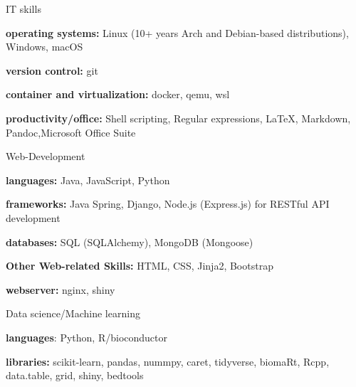 

\begin{cvskills}
  \cvskill
    {IT skills} %
    {
      \begin{cvitems}
        \item {\textbf{operating systems:} Linux (10+ years Arch and Debian-based distributions), Windows, macOS}
        \item {\textbf{version control:} git}
        \item {\textbf{container and virtualization:} docker, qemu, wsl}
        \item {\textbf{productivity/office:} Shell scripting, Regular expressions, LaTeX, Markdown, Pandoc,\newline Microsoft Office Suite}
      \end{cvitems}
      }
\cvskill
      {Web-Development} %
      {
        \begin{cvitems}
          \item {\textbf{languages:} Java, JavaScript, Python}
          \item {\textbf{frameworks:} Java Spring, Django, Node.js (Express.js) for RESTful API development}
          \item {\textbf{databases:} SQL (SQLAlchemy), MongoDB (Mongoose)}
          \item {\textbf{Other Web-related Skills:} HTML, CSS, Jinja2, Bootstrap}
          \item {\textbf{webserver:} nginx, shiny}
        \end{cvitems}
        }
  \cvskill
    {Data science/Machine learning}%
    {
      \begin{cvitems}
        \item {\textbf{languages}: Python, R/bioconductor}
        \item {\textbf{libraries:} scikit-learn, pandas, nummpy, caret, tidyverse, biomaRt, Rcpp, data.table, grid,        \newline shiny, bedtools}

\end{cvitems}}
\end{cvskills}
